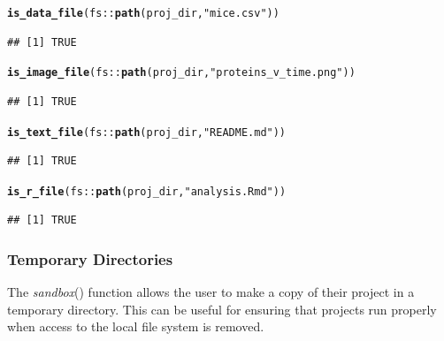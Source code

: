 \documentclass[APA,LATO1COL]{WileyNJD-v2}\usepackage[]{graphicx}\usepackage[]{color}
\makeatletter
\newcommand{\hlstr}[1]{\textcolor[rgb]{0.192,0.494,0.8}{#1}}%
\newcommand{\hlopt}[1]{\textcolor[rgb]{0,0,0}{#1}}%
\newcommand{\hlstd}[1]{\textcolor[rgb]{0.345,0.345,0.345}{#1}}%
\newcommand{\hlkwd}[1]{\textcolor[rgb]{0.737,0.353,0.396}{\textbf{#1}}}%
\newenvironment{kframe}{%
 \def\at@end@of@kframe{}%
 \ifinner\ifhmode%
  \def\at@end@of@kframe{\end{minipage}}%
  \begin{minipage}{\columnwidth}%
 \fi\fi%
 \def\FrameCommand##1{\hskip\@totalleftmargin \hskip-\fboxsep
 \colorbox{shadecolor}{##1}\hskip-\fboxsep
     \hskip-\linewidth \hskip-\@totalleftmargin \hskip\columnwidth}%
 \MakeFramed {\advance\hsize-\width
   \@totalleftmargin\z@ \linewidth\hsize
   \@setminipage}}%
 {\par\unskip\endMakeFramed%
 \at@end@of@kframe}
\newenvironment{knitrout}{}{} %
\newcommand{\func}[1]{\textit{#1}()}
\makeatother
\begin{document}
\begin{knitrout}
\color{fgcolor}\begin{kframe}
\begin{alltt}
\hlkwd{is_data_file}\hlstd{(fs}\hlopt{::}\hlkwd{path}\hlstd{(proj_dir,} \hlstr{"mice.csv"}\hlstd{))}
\end{alltt}
\begin{verbatim}
## [1] TRUE
\end{verbatim}
\begin{alltt}
\hlkwd{is_image_file}\hlstd{(fs}\hlopt{::}\hlkwd{path}\hlstd{(proj_dir,} \hlstr{"proteins_v_time.png"}\hlstd{))}
\end{alltt}
\begin{verbatim}
## [1] TRUE
\end{verbatim}
\begin{alltt}
\hlkwd{is_text_file}\hlstd{(fs}\hlopt{::}\hlkwd{path}\hlstd{(proj_dir,} \hlstr{"README.md"}\hlstd{))}
\end{alltt}
\begin{verbatim}
## [1] TRUE
\end{verbatim}
\begin{alltt}
\hlkwd{is_r_file}\hlstd{(fs}\hlopt{::}\hlkwd{path}\hlstd{(proj_dir,} \hlstr{"analysis.Rmd"}\hlstd{))}
\end{alltt}
\begin{verbatim}
## [1] TRUE
\end{verbatim}
\end{kframe}
\end{knitrout}

\subsubsection{Temporary Directories}

The \func{sandbox} function allows the user to make a copy of their project in a temporary directory. This can be useful for ensuring that projects run properly when access to the local file system is removed.
\end{document}
